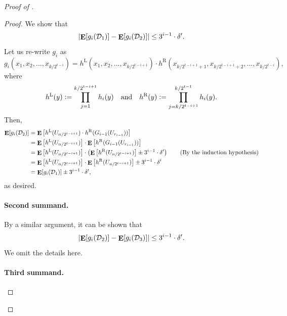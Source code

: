 \documentclass[10pt,a4paper]{article}
\DeclareMathOperator*\Exp{{\bf E}}
\newcommand{\LH}[1]{#1^{\mathrm{L}}}
\newcommand{\RH}[1]{#1^{\mathrm{R}}}
\begin{document}
\begin{proof}[Proof of ]
\begin{proof}
	    	We show that
            \begin{equation}\label{eq:prg-lc-triangle-1}
				\left|\Exp[g_i(\mathcal{D}_1)]-\Exp[g_i(\mathcal{D}_2)]\right| \leq 3^{i-1}\cdot \delta'.
			\end{equation}
			Let us re-write $g_i$ as
	    	\[
	    		g_i(x_1,x_2,\dots,x_{k/2^{t-i}})=\LH{h}(x_1,x_2,\dots,x_{k/2^{t-i+1}})\cdot \RH{h}(x_{k/2^{t-i+1}+1},x_{k/2^{t-i+1}+2},\dots,x_{k/2^{t-i}}),
	    	\]
	    	where
	    	\[
	    	    \LH{h}(y)\vcentcolon=\prod_{j=1}^{k/2^{t-i+1}}h_i(y) \text{\quad and\quad  } \RH{h}(y)\vcentcolon=\prod_{j=k/2^{t-i+1}}^{k/2^{t-1}}h_i(y).
	    	\]
	    	Then,
	    	\begin{align*}
	    		\Exp[g_i(\mathcal{D}_2)]&=\Exp\left[\LH{h}(U_{n/2^{t-i+1}})\cdot \RH{h}(G_{i-1}(U_{r_{i-1}}))\right]\\
	    		&=\Exp\left[\LH{h}(U_{n/2^{t-i+1}})\right]\cdot\Exp\left[\RH{h}(G_{i-1}(U_{r_{i-1}}))\right]\\
	    		&=\Exp\left[\LH{h}(U_{n/2^{t-i+1}})\right]\cdot\left(\Exp\left[\RH{h}(U_{n/2^{t-i+1}})\right]\pm 3^{i-1}\cdot \delta'\right)
	    		\tag{By the induction hypothesis}\\
	    		&=\Exp\left[\LH{h}(U_{n/2^{t-i+1}})\right]\cdot\Exp\left[\RH{h}(U_{n/2^{t-i+1}})\right] \pm 3^{i-1}\cdot \delta'\\
	    		&=\Exp[g_i(\mathcal{D}_1)]\pm 3^{i-1}\cdot \delta',
	    	\end{align*}
	    	as desired.
	    	
	    	\paragraph{Second summand.}
	    	
	    	By a similar argument, it can be shown that
            \begin{equation}\label{eq:prg-lc-triangle-2}
				\left|\Exp[g_i(\mathcal{D}_2)]-\Exp[g_i(\mathcal{D}_3)]\right| \leq 3^{i-1}\cdot \delta'.
			\end{equation}
			We omit the details here.
	    	
	    	\paragraph{Third summand.}
	    	

\end{proof}
\end{proof}
\end{document}
